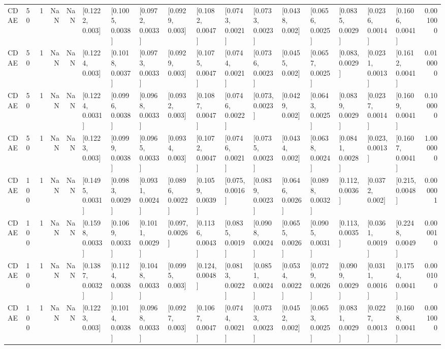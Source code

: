 \begin{tabular}{lllrrllllllllllllr}
    CDAE &   50 &     1 &   NaN &   NaN &   [0.1222, 0.003] &  [0.1005, 0.0038] &  [0.0972, 0.0033] &   [0.0929, 0.003] &  [0.1082, 0.0047] &  [0.0743, 0.0021] &  [0.0733, 0.0023] &   [0.0438, 0.002] &  [0.0656, 0.0025] &  [0.0835, 0.0029] &  [0.0236, 0.0014] &  [0.1606, 0.0041] &  0.001000 \\
    CDAE &   50 &     1 &   NaN &   NaN &   [0.1224, 0.003] &  [0.1018, 0.0037] &  [0.0973, 0.0033] &   [0.0929, 0.003] &  [0.1075, 0.0047] &  [0.0744, 0.0021] &  [0.0736, 0.0023] &   [0.0455, 0.002] &  [0.0657, 0.0025] &   [0.083, 0.0029] &  [0.0231, 0.0013] &  [0.1612, 0.0041] &  0.010000 \\
    CDAE &   50 &     1 &   NaN &   NaN &  [0.1224, 0.0031] &  [0.0996, 0.0038] &  [0.0968, 0.0033] &   [0.0932, 0.003] &  [0.1087, 0.0047] &  [0.0746, 0.0022] &   [0.073, 0.0023] &   [0.0429, 0.002] &  [0.0643, 0.0025] &  [0.0839, 0.0029] &  [0.0237, 0.0014] &  [0.1609, 0.0041] &  0.100000 \\
    CDAE &   50 &     1 &   NaN &   NaN &   [0.1223, 0.003] &  [0.0999, 0.0038] &  [0.0965, 0.0033] &   [0.0934, 0.003] &  [0.1072, 0.0047] &  [0.0746, 0.0021] &  [0.0735, 0.0023] &   [0.0434, 0.002] &  [0.0638, 0.0024] &  [0.0841, 0.0028] &   [0.023, 0.0013] &  [0.1607, 0.0041] &  1.000000 \\
    CDAE &  100 &     1 &   NaN &   NaN &  [0.1495, 0.0031] &  [0.0983, 0.0029] &  [0.0931, 0.0024] &  [0.0896, 0.0022] &  [0.1059, 0.0039] &   [0.075, 0.0016] &  [0.0839, 0.0023] &  [0.0646, 0.0026] &  [0.0898, 0.0032] &   [0.112, 0.0036] &   [0.0372, 0.002] &   [0.215, 0.0048] &  0.000001 \\
    CDAE &  100 &     1 &   NaN &   NaN &  [0.1598, 0.0033] &  [0.1069, 0.0033] &  [0.1011, 0.0029] &   [0.097, 0.0026] &  [0.1136, 0.0043] &  [0.0835, 0.0019] &  [0.0908, 0.0024] &  [0.0655, 0.0026] &  [0.0905, 0.0031] &   [0.113, 0.0035] &  [0.0361, 0.0019] &  [0.2248, 0.0049] &  0.000010 \\
    CDAE &  100 &     1 &   NaN &   NaN &  [0.1387, 0.0032] &  [0.1124, 0.0038] &  [0.1048, 0.0033] &   [0.0995, 0.003] &   [0.124, 0.0048] &  [0.0813, 0.0022] &  [0.0851, 0.0024] &  [0.0534, 0.0022] &  [0.0729, 0.0026] &  [0.0909, 0.0029] &  [0.0311, 0.0016] &  [0.1754, 0.0041] &  0.000100 \\
    CDAE &  100 &     1 &   NaN &   NaN &   [0.1223, 0.003] &  [0.1014, 0.0038] &  [0.0968, 0.0033] &   [0.0927, 0.003] &  [0.1067, 0.0047] &  [0.0744, 0.0021] &  [0.0733, 0.0023] &   [0.0452, 0.002] &  [0.0653, 0.0025] &  [0.0831, 0.0029] &  [0.0227, 0.0013] &  [0.1608, 0.0041] &  0.001000 \\

\end{tabular}
